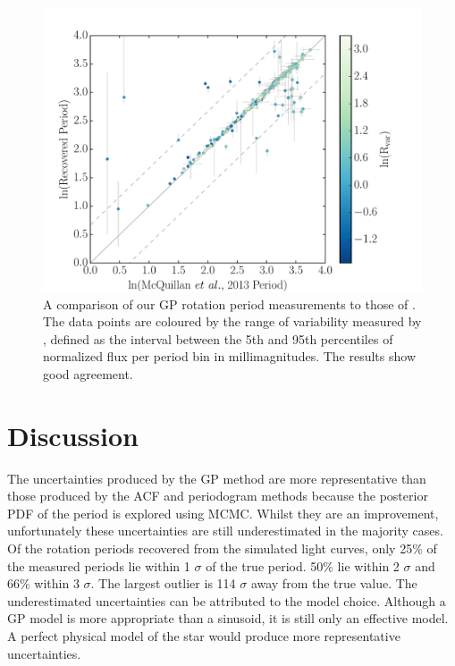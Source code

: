 \documentclass[useAMS, usenatbib, preprint, 12pt]{aastex}
\newcommand{\tdmcomment}[1]{{\color{blue}#1}}
\begin{document}
\begin{figure}
\begin{center}
\includegraphics[width=6in, clip=true]{figures/comparison_koi_02_03.pdf}
\caption[Comparison with McQuillan results.]
{A comparison of our GP rotation period measurements to those of
\citet{Mcquillan2013}.
The data points are coloured by the range of variability measured by
    \citet{Mcquillan2013}, defined as the interval between the 5th and 95th
    percentiles of normalized flux per period bin in millimagnitudes.
    The results show good agreement.}
\label{fig:mcquillan}
\end{center}
\end{figure}

\section{Discussion}
\label{sec:discussion}

The uncertainties produced by the GP method are more representative than those
produced by the ACF and periodogram methods because the posterior PDF of the
period is explored using MCMC.
Whilst they are an improvement, unfortunately these uncertainties are still
underestimated in the majority cases.
Of the rotation periods recovered from the simulated light curves, only 25\%
of the measured periods lie within 1 $\sigma$ of the true period.
50\% lie within 2 $\sigma$ and 66\% within 3 $\sigma$.
The largest outlier is 114 $\sigma$ away from the true value.
The underestimated uncertainties can be attributed to the model choice.
Although a GP model is more appropriate than a sinusoid, it is still only an
 effective model.
A perfect physical model of the star would produce more representative
uncertainties.
\end{document}
